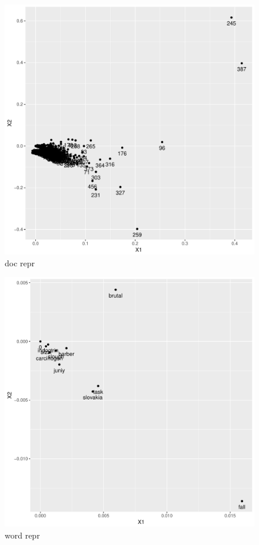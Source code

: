 \documentclass[12pt]{article}
\begin{document}
\begin{figure}[htbp]
\centering
\includegraphics[width=1.0\textwidth]{../result/doc.pdf}
\caption{doc repr}
\label{fig:doc}
\end{figure}

\begin{figure}[htbp]
\centering
\includegraphics[width=1.0\textwidth]{../result/word.pdf}
\caption{word repr}
\label{fig:word}
\end{figure}
\end{document}
